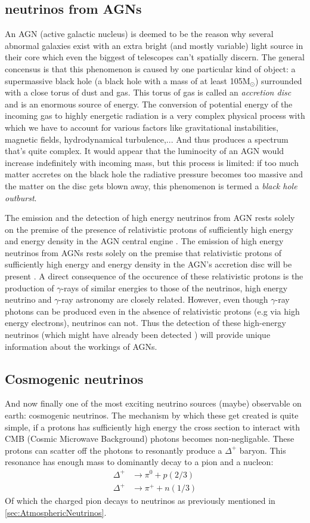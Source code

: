 \documentclass[11pt,a4paper,faculty=we,language=en,doctype=report]{cls/ugent-doc}
\begin{document}
\subsection{neutrinos from AGNs}
An AGN (active galactic nucleus) is deemed to be the reason why several abnormal galaxies exist with
an extra bright (and mostly variable) light source in their core which even the biggest of telescopes
can't spatially discern. The general concensus is that this phenomenon is caused by one particular
kind of object: a supermassive black hole (a black hole with a mass of at least 105M$_\odot$) surrounded with
a close torus of dust and gas.
This torus of gas is called an \textit{accretion disc} and is an enormous source of energy. The conversion
of potential energy of the incoming gas to highly energetic radiation is a very complex physical process
with which we have to account for various factors like gravitational instabilities, magnetic fields, hydrodynamical
turbulence,... And thus produces a spectrum that's quite complex.
It would appear that the luminocity of an AGN would increase indefinitely with incoming mass, but this process is 
limited: if too much matter accretes on the black hole the radiative pressure becomes too massive and the 
matter on the disc gets blown away, this phenomenon is termed a \textit{black hole outburst}.

The emission and the detection of high energy neutrinos from AGN rests solely
on the premise of the presence of relativistic protons of sufficiently high energy and
energy density in the AGN central engine .    
The emission of high energy neutrinos from AGNs rests solely on the premise that relativistic
protons of sufficiently high energy and energy density in the AGN's accretion disc will be present \cite{NASANeutrinos}.
A direct consequence of the occurence of these relativistic protons is the production
of $\gamma$-rays of similar energies to those of the neutrinos, high energy neutrino and $\gamma$-ray 
astronomy are closely related.
However, even though $\gamma$-ray photons can be produced even in the absence of relativistic protons
(e.g via high energy electrons), neutrinos can not. Thus the detection of these high-energy neutrinos
(which might have already been detected \cite{AGNNeutrino}) will provide unique information about the 
workings of AGNs.

\subsection{Cosmogenic neutrinos}
And now finally one of the most exciting neutrino sources (maybe) observable on earth:
cosmogenic neutrinos. The mechanism by which these get created is quite simple, if
a protons has sufficiently high energy the cross section to interact with CMB (Cosmic
Microwave Background) photons becomes non-negligable.
These protons can scatter off the photons to resonantly produce a $\Delta^+$ baryon. This
resonance has enough mass to dominantly decay to a pion and a nucleon:
\begin{align}
	\Delta^+ &\rightarrow \pi^0 + p (2/3)\\
	\Delta^+ &\rightarrow \pi^+ + n (1/3)
\end{align}
Of which the charged pion decays to neutrinos as previously mentioned in 
\ref{sec:AtmosphericNeutrinos}.
\end{document}
